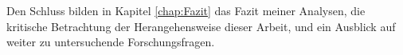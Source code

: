 Den Schluss bilden in Kapitel \ref{chap:Fazit} das Fazit meiner Analysen, die kritische Betrachtung der Herangehensweise dieser Arbeit, und ein Ausblick auf weiter zu untersuchende Forschungsfragen.

